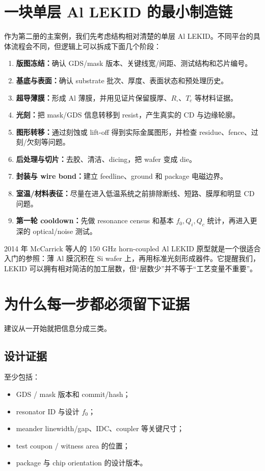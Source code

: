 \section{一块单层 Al LEKID 的最小制造链}

作为第二册的主案例，我们先考虑结构相对清楚的单层 Al LEKID。不同平台的具体流程会不同，但逻辑上可以拆成下面几个阶段：

\begin{enumerate}
  \item \textbf{版图冻结：}确认 GDS/mask 版本、关键线宽/间距、测试结构和芯片编号。
  \item \textbf{基底与表面：}确认 substrate 批次、厚度、表面状态和预处理历史。
  \item \textbf{超导薄膜：}形成 Al 薄膜，并用见证片保留膜厚、$R_\square$、$T_c$ 等材料证据。
  \item \textbf{光刻：}把 mask/GDS 信息转移到 resist，产生真实的 CD 与边缘轮廓。
  \item \textbf{图形转移：}通过刻蚀或 lift-off 得到实际金属图形，并检查 residue、fence、过刻/欠刻等问题。
  \item \textbf{后处理与切片：}去胶、清洁、dicing，把 wafer 变成 die。
  \item \textbf{封装与 wire bond：}建立 feedline、ground 和 package 电磁边界。
  \item \textbf{室温/材料表征：}尽量在进入低温系统之前排除断线、短路、膜厚和明显 CD 问题。
  \item \textbf{第一轮 cooldown：}先做 resonance census 和基本 $f_0,Q_i,Q_c$ 统计，再进入更深的 optical/noise 测试。
\end{enumerate}

2014 年 McCarrick 等人的 150 GHz horn-coupled Al LEKID 原型就是一个很适合入门的参照：薄 Al 膜沉积在 Si wafer 上，再用标准光刻形成器件。它提醒我们，LEKID 可以拥有相对简洁的加工层数，但“层数少”并不等于“工艺变量不重要”。

\section{为什么每一步都必须留下证据}

建议从一开始就把信息分成三类。

\subsection{设计证据}

至少包括：

\begin{itemize}
  \item GDS / mask 版本和 commit/hash；
  \item resonator ID 与设计 $f_0$；
  \item meander linewidth/gap、IDC、coupler 等关键尺寸；
  \item test coupon / witness area 的位置；
  \item package 与 chip orientation 的设计版本。
\end{itemize}

